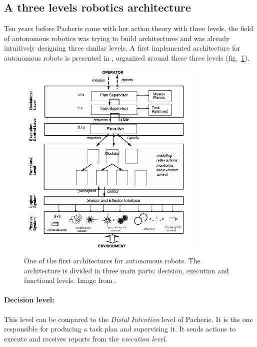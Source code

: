 \documentclass[english,a4paper,11pt,twoside]{StyleThese}
\begin{document}
\subsection{A three levels robotics architecture}

\label{subsec:Archi}

Ten years before Pacherie came with her action theory with three levels, the field of autonomous robotics was trying to build architectures and was already intuitively designing three similar levels. A first implemented architecture for autonomous robots is presented in \cite{alami1998architecture}, organized around these three levels (fig.~\ref{fig:FirstArchi}).

\begin{figure}[!h]
	\centering
    \includegraphics[width=0.8\textwidth]{figs/Chapter1/ArchitectureHold.png}
    \caption{One of the first architectures for autonomous robots. The architecture is divided in three main parts: decision, execution and functional levels. Image from \cite{alami1998architecture}.}
    \label{fig:FirstArchi}
\end{figure}

\paragraph{Decision level:}
This level can be compared to the \textit{Distal Intention} level of Pacherie. It is the one responsible for producing a task plan and supervising it. It sends actions to execute and receives reports from the \textit{execution level}.
\end{document}
